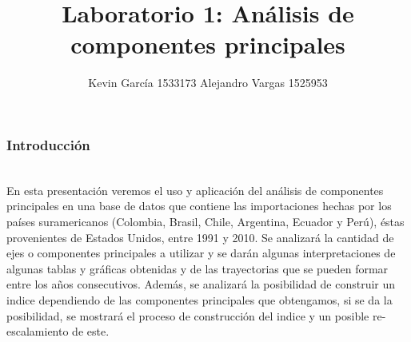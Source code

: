 \documentclass[12pt]{beamer}
\author[Kevin García - Alejandro Vargas]{Kevin García 1533173 \newline Alejandro Vargas 1525953}
\title[Análisis de componentes principales]{Laboratorio 1: Análisis de componentes principales}
\begin{document}
\justify
\begin{frame}
\titlepage
\end{frame}

\begin{frame}
\frametitle{Introducción}
~\\En esta presentación veremos el uso y aplicación del análisis de componentes principales en una base de datos que contiene las importaciones hechas por los países suramericanos (Colombia, Brasil, Chile, Argentina, Ecuador y Perú), éstas provenientes de Estados Unidos, entre 1991 y 2010. Se analizará la cantidad de ejes o componentes principales a utilizar y se darán algunas interpretaciones de algunas tablas y gráficas obtenidas y de las trayectorias que se pueden formar entre los años consecutivos. Además, se analizará la posibilidad de construir un indice dependiendo de las componentes principales que obtengamos, si se da la posibilidad, se mostrará el proceso de construcción del indice y un posible re-escalamiento de este. 
\end{frame}
\end{document}
